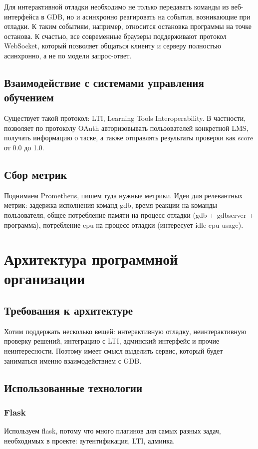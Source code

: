 \documentclass[a4paper,article,14pt]{extarticle}
\begin{document}
Для интерактивной отладки необходимо не только передавать команды из веб-интерфейса в GDB, но и асинхронно реагировать на события, возникающие при отладки. К таким событиям, например, относится остановка программы на точке останова. К счастью, все современные браузеры поддерживают протокол WebSocket, который позволяет общаться клиенту и серверу полностью асинхронно, а не по модели запрос-ответ.

\subsection{Взаимодействие с системами управления обучением}

Существует такой протокол: LTI, Learning Tools Interoperability. В частности, позволяет по протоколу OAuth авторизовывать пользователей конкретной LMS, получать информацию о таске, а также отправлять результаты проверки как score от 0.0 до 1.0.

\subsection{Сбор метрик}

Поднимаем Prometheus, пишем туда нужные метрики. Идеи для релевантных метрик: задержка исполнения команд gdb, время реакции на команды пользователя, общее потребление памяти на процесс отладки (gdb + gdbserver + программа), потребление cpu на процесс отладки (интересует idle cpu usage).

\section{Архитектура программной организации}

\subsection{Требования к архитектуре}

Хотим поддержать несколько вещей: интерактивную отладку, неинтерактивную проверку решений, интеграцию с LTI, админский интерфейс и прочие неинтересности. Поэтому имеет смысл выделить сервис, который будет заниматься именно взаимодействием с GDB.

\subsection{Использованные технологии}

\subsubsection{Flask}
Используем flask, потому что много плагинов для самых разных задач, необходимых в проекте: аутентификация, LTI, админка.
\end{document}
